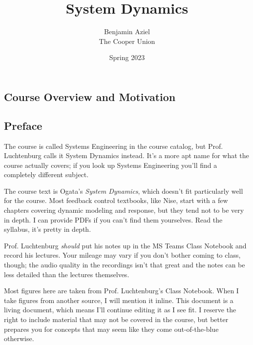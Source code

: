 \documentclass{report}
\begin{document}
\thispagestyle{empty}
\title{\textbf{System Dynamics}}
\date{Spring 2023}
\author{Benjamin Aziel\\ The Cooper Union}
\maketitle

\thispagestyle{empty}
\begin{onehalfspacing}
\tableofcontents

\begin{flushleft}
\chapter{Course Overview and Motivation}

\section*{Preface}

The course is called Systems Engineering in the course catalog, but Prof. Luchtenburg calls it System Dynamics instead. It's a more apt name for what the course actually covers; if you look up Systems Engineering you'll find a completely different subject.

\medskip

The course text is Ogata's \textit{System Dynamics}, which doesn't fit particularly well for the course. Most feedback control textbooks, like Nise, start with a few chapters covering dynamic modeling and response, but they tend not to be very in depth. I can provide PDFs if you can't find them yourselves. Read the syllabus, it's pretty in depth.

\medskip

Prof. Luchtenburg \textit{should} put his notes up in the MS Teams Class Notebook and record his lectures. Your mileage may vary if you don't bother coming to class, though; the audio quality in the recordings isn't that great and the notes can be less detailed than the lectures themselves.

\medskip

Most figures here are taken from Prof. Luchtenburg's Class Notebook. When I take figures from another source, I will mention it inline. This document is a living document, which means I'll continue editing it as I see fit. I reserve the right to include material that may not be covered in the course, but better prepares you for concepts that may seem like they come out-of-the-blue otherwise.


\end{flushleft}
\end{onehalfspacing}
\end{document}
